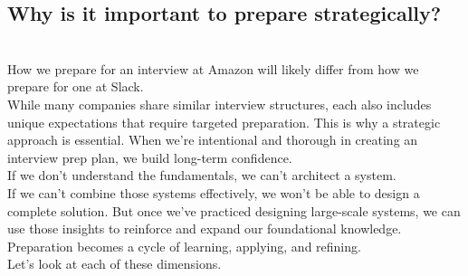 \subsection{Why is it important to prepare strategically?}\label{c7fQXsCm-3QaDyPNyBa8p}
\\
How we prepare for an interview at Amazon will likely differ from how we prepare for one at Slack.
\\
While many companies share similar interview structures, each also includes unique expectations that require targeted preparation. This is why a strategic approach is essential. When we're intentional and thorough in creating an interview prep plan, we build long-term confidence.
\\
If we don't understand the fundamentals, we can't architect a system.
\\
If we can't combine those systems effectively, we won't be able to design a complete solution. But once we've practiced designing large-scale systems, we can use those insights to reinforce and expand our foundational knowledge. Preparation becomes a cycle of learning, applying, and refining.
\\
Let's look at each of these dimensions.

\begin{center}
\end{center}

